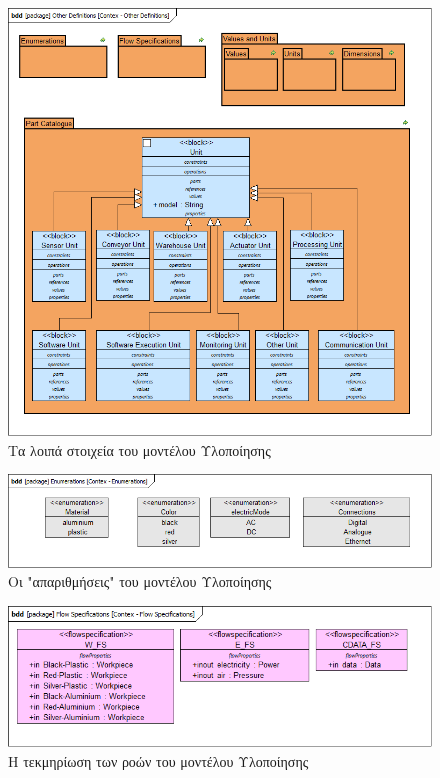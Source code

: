 \documentclass[a4paper,12pt,twoside]{report}
\begin{document}
\begin{appendices}
				\begin{figure}[hp]
					\centering
					\includegraphics[scale=0.50]{DesignModel_Contex-OtherDefinitions.png}
					\caption{Τα λοιπά στοιχεία του μοντέλου Υλοποίησης}
					\label{φωτ:Τα λοιπά στοιχεία του μοντέλου Υλοποίησης}
				\end{figure}
				
				\begin{figure}[hp]
					\centering
					\includegraphics[scale=0.50]{DesignModel_Contex-Enumerations.png}
					\caption{Οι "απαριθμήσεις" του μοντέλου Υλοποίησης}
					\label{φωτ:Οι "απαριθμήσεις" του μοντέλου Υλοποίησης}
				\end{figure}
				
				\begin{figure}[hp]
					\centering
					\includegraphics[scale=0.50]{DesignModel_Contex-FlowSpecifications.png}
					\caption{Η τεκμηρίωση των ροών του μοντέλου Υλοποίησης}
					\label{φωτ:Η τεκμηρίωση των ροών του μοντέλου Υλοποίησης}
				\end{figure}
				

\end{appendices}
\end{document}
